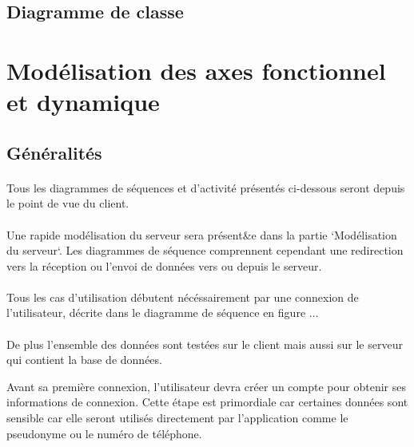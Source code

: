 \documentclass[titlepage, 12pt]{report}
\begin{document}
\subsection{Diagramme de classe}




\section{Modélisation des axes fonctionnel et dynamique}

\subsection{Généralités}

\paragraph{}Tous les diagrammes de séquences et d'activité présentés ci-dessous seront depuis le point de vue du client.
\paragraph{}Une rapide modélisation du serveur sera présent&e dans la partie `Modélisation du serveur`. Les diagrammes de séquence comprennent cependant une redirection vers la réception ou l'envoi de données vers ou depuis le serveur.
\paragraph{}Tous les cas d'utilisation débutent nécéssairement par une connexion de l'utilisateur,  décrite dans le diagramme de séquence en figure ...
\paragraph{}De plus l'ensemble des données sont testées sur le client mais aussi sur le serveur qui contient la base de données.


Avant sa première connexion, l'utilisateur devra créer un compte pour obtenir ses informations de connexion. Cette étape est primordiale car certaines données sont sensible car elle seront utilisés directement par l'application comme le pseudonyme ou le numéro de téléphone.
\end{document}
